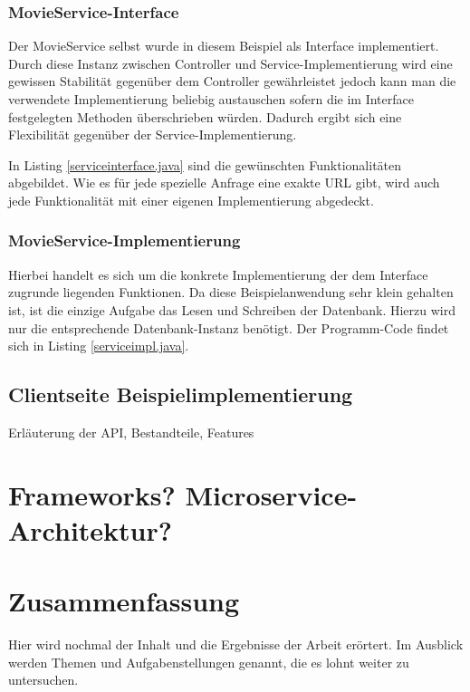 \documentclass[fleqn,10.5pt,ngerman]{SelfArx}
\begin{document}
\subsubsection{MovieService-Interface}
Der MovieService selbst wurde in diesem Beispiel als Interface implementiert. Durch diese Instanz zwischen Controller und Service-Implementierung wird eine gewissen Stabilität gegenüber dem Controller gewährleistet jedoch kann man die verwendete Implementierung beliebig austauschen sofern die im Interface festgelegten Methoden überschrieben würden. Dadurch ergibt sich eine Flexibilität gegenüber der Service-Implementierung. 

In Listing \ref{serviceinterface.java} sind die gewünschten Funktionalitäten abgebildet. Wie es für jede spezielle Anfrage eine exakte URL gibt, wird auch jede Funktionalität mit einer eigenen Implementierung abgedeckt.
\subsubsection{MovieService-Implementierung}
Hierbei handelt es sich um die konkrete Implementierung der dem Interface zugrunde liegenden Funktionen. Da diese Beispielanwendung sehr klein gehalten ist, ist die einzige Aufgabe das Lesen und Schreiben der Datenbank. Hierzu wird nur die entsprechende Datenbank-Instanz benötigt. Der Programm-Code findet sich in Listing \ref{serviceimpl.java}.

\subsection{Clientseite Beispielimplementierung}
Erläuterung der API, Bestandteile, Features 

\section{Frameworks? Microservice-Architektur?}

\section{Zusammenfassung}
Hier wird nochmal der Inhalt und die Ergebnisse der Arbeit erörtert. Im Ausblick werden Themen und Aufgabenstellungen genannt, die es lohnt weiter zu untersuchen.
\end{document}
